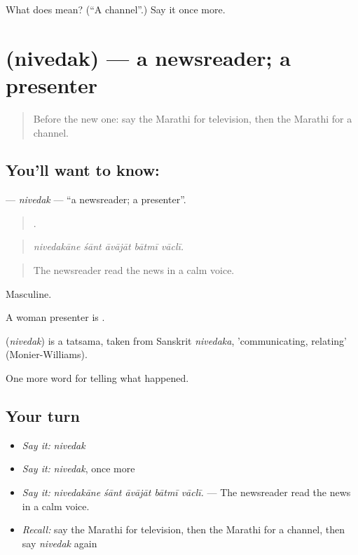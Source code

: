 \begin{tcolorbox}[breakable,colback=teal!4,colframe=teal!35!black,title={Before you move on}]
What does  mean? (\textquotedblleft{}A channel\textquotedblright{}.) Say it once more.
\end{tcolorbox}
\section[\texorpdfstring{\mr{निवेदक} (nivedak)}{निवेदक (nivedak)}]{ (nivedak) — a newsreader; a presenter}

\label{lesson:MR-C312-nivedak}



\begin{quote}
Before the new one: say the Marathi for television, then the Marathi for a channel.
\end{quote}

\subsection*{You'll want to know: }
\textbf{} — \emph{nivedak} — \textquotedblleft{}a newsreader; a presenter\textquotedblright{}.

\begin{quote}
    .
\end{quote}

\begin{quote}
\emph{nivedakāne śānt āvājāt bātmī vāclī.}
\end{quote}

\begin{quote}
The newsreader read the news in a calm voice.
\end{quote}

Masculine.

A woman presenter is .

\begin{cousinweb}
\textbf{} (\emph{nivedak}) is a tatsama, taken from Sanskrit \emph{nivedaka}, 'communicating, relating' (Monier-Williams).
\end{cousinweb}

\begin{grammarlens}[title={What you've built}]
One more word for telling what happened.
\end{grammarlens}

\subsection*{Your turn}
\begin{itemize}
\raggedright
  \item \emph{Say it:} \emph{nivedak}
  \item \emph{Say it:} \emph{nivedak}, once more
  \item \emph{Say it:} \emph{nivedakāne śānt āvājāt bātmī vāclī.} — The newsreader read the news in a calm voice.
  \item \emph{Recall:} say the Marathi for television, then the Marathi for a channel, then say \emph{nivedak} again
\end{itemize}

